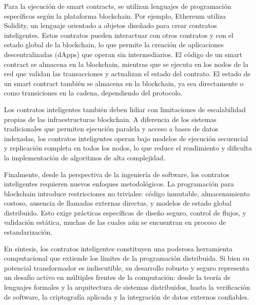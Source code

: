 


Para la ejecución de smart contracts, se utilizan lenguajes de programación específicos según la plataforma blockchain. Por ejemplo, Ethereum utiliza Solidity, un lenguaje orientado a objetos diseñado para crear contratos inteligentes. Estos contratos pueden interactuar con otros contratos y con el estado global de la blockchain, lo que permite la creación de aplicaciones descentralizadas (dApps) que operan sin intermediarios. El código de un smart contract se almacena en la blockchain, mientras que se ejecuta en los nodos de la red que validan las transacciones y actualizan el estado del contrato. El estado de un smart contract también se almacena en la blockchain, ya sea directamente o como transiciones en la cadena, dependiendo del protocolo.

Los contratos inteligentes también deben lidiar con limitaciones de escalabilidad propias de las infraestructuras blockchain. A diferencia de los sistemas tradicionales que permiten ejecución paralela y acceso a bases de datos indexadas, los contratos inteligentes operan bajo modelos de ejecución secuencial y replicación completa en todos los nodos, lo que reduce el rendimiento y dificulta la implementación de algoritmos de alta complejidad.

Finalmente, desde la perspectiva de la ingeniería de software, los contratos inteligentes requieren nuevos enfoques metodológicos. La programación para blockchain introduce restricciones no triviales: código inmutable, almacenamiento costoso, ausencia de llamadas externas directas, y modelos de estado global distribuido. Esto exige prácticas específicas de diseño seguro, control de flujos, y validación estática, muchas de las cuales aún se encuentran en proceso de estandarización.

En síntesis, los contratos inteligentes constituyen una poderosa herramienta computacional que extiende los límites de la programación distribuida. Si bien su potencial transformador es indiscutible, su desarrollo robusto y seguro representa un desafío activo en múltiples frentes de la computación: desde la teoría de lenguajes formales y la arquitectura de sistemas distribuidos, hasta la verificación de software, la criptografía aplicada y la integración de datos externos confiables.

